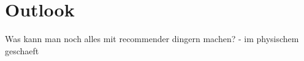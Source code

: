 

\section{Outlook}
Was kann man noch alles mit recommender dingern machen?
- im physischem geschaeft

